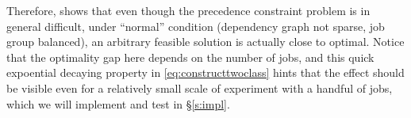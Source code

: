 Therefore, \cite{schulz2011near} shows that even though the precedence constraint problem is in general difficult, under ``normal'' condition (dependency graph not sparse, job group balanced), an arbitrary feasible solution is actually close to optimal. Notice that the optimality gap here depends on the number of jobs, and this quick expoential decaying property in \eqref{eq:constructtwoclass} hints that the effect should be visible even for a relatively small scale of experiment with a handful of jobs, which we will implement and test in \S\ref{s:impl}. 